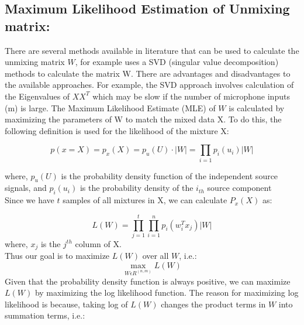 \documentclass[journal,onecolumn,12pt]{IEEEtran}
\begin{document}
\subsection{Maximum Likelihood Estimation of Unmixing matrix:}
There are several methods available in literature that can be used to calculate the unmixing matrix $W$, \cite{} for example uses a SVD (singular value decomposition) methods to calculate the matrix W. There are advantages and disadvantages to the available approaches. For example, the SVD approach involves calculation of the Eigenvalues of $XX^T$ which may be slow if the number of microphone inputs (m) is large.
The Maximum Likelihood Estimate (MLE) of $W$ is calculated by maximizing the parameters of W to match the mixed data X. To do this, the following definition is used for the likelihood of the mixture X:

\begin{equation}
    p(x=X) = p_x(X) = p_u(U)\cdot|W| = \prod_{i=1}p_i(u_i)|W|    
\end{equation}

where, $p_u(U)$ is the probability density function of the independent source signals, and $p_i(u_i)$ is the probability density of the $i_{th}$ source component\\

Since we have $t$ samples of all mixtures in X, we can calculate $P_x(X)$ as:


\begin{equation}
    L(W) = \prod_{j=1}^t\prod_{i=1}^np_i(w_i^Tx_j)|W|
    \label{eq:likelihood def}
\end{equation}
where, $x_j$ is the $j^{th}$ column of X.\\
Thus our goal is to maximize $L(W)$ over all $W$, i.e.:
\begin{equation}
    \max_{W\epsilon R^{(n,m)}} L(W)
    \label{eq:optimality-eqn}
\end{equation}
Given that the probability density function is always positive, we can maximize $L(W)$ by maximizing the log likelihood function. The reason for maximizing log likelihood is because, taking log of $L(W)$ changes the product terms in $W$ into summation terms, i.e.:
\end{document}
